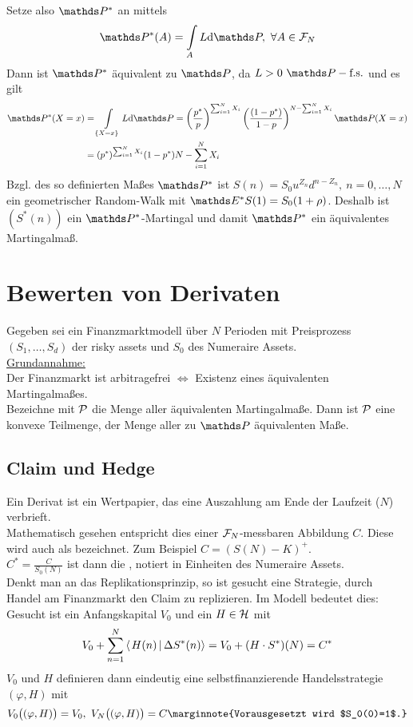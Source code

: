 \begin{enumerate}[(a)]
	Setze also $\Pw^*$ an mittels
	\[
	\Pw^*(A)=\int\limits_A L\dint \Pw,~\forall A\in \F_N
	\]
	Dann ist $\Pw^*$ äquivalent zu $\Pw$, da $L>0~\Pfs$ und es gilt
	\begin{equation*}
	\begin{aligned}
		\Pw^*(X=x) &= \int\limits_{\{X=x\}}L\dint \Pw=\enbrace{\frac{p^*}{p}}^{\sum_{i=1}^{N}X_i}\enbrace{\frac{(1-p^*)}{1-p}}^{N-\sum_{i=1}^{N}X_i} \Pw(X=x)\\
		&= (p^*)^{\sum_{i=1}^{N}X_i}(1-p^*){N-\sum_{i=1}^{N}X_i}
	\end{aligned}
	\end{equation*}
	Bzgl. des so definierten Maßes $\Pw^*$ ist $S(n)=S_0u^{Z_n}d^{n-Z_n},~n=0,\dots,N$ ein geometrischer Random-Walk mit $\E^*S(1)=S_0(1+\rho)$.
	Deshalb ist $(S^*(n))$ ein $\Pw^*$-Martingal und damit $\Pw^*$ ein äquivalentes Martingalmaß.
\end{enumerate}

\newpage
\section{Bewerten von Derivaten}
\label{sec:bewerten_derivate}
Gegeben sei ein Finanzmarktmodell über $N$ Perioden mit Preisprozess $(S_1,\dots,S_d)$ der risky assets und $S_0$ des Numeraire Assets.\\

\uline{Grundannahme:}\\
Der Finanzmarkt ist arbitragefrei $\Leftrightarrow$ Existenz eines äquivalenten Martingalmaßes.\\
Bezeichne mit $\mathcal{P}$ die Menge aller äquivalenten Martingalmaße.
Dann ist $\mathcal{P}$ eine konvexe Teilmenge, der Menge aller zu $\Pw$ äquivalenten Maße.

\subsection{Claim und Hedge}
\label{sub:claim_hedge}
Ein Derivat ist ein Wertpapier, das eine Auszahlung am Ende der Laufzeit ($N$) verbrieft.\\
Mathematisch gesehen entspricht dies einer $\mathcal{F}_N$-messbaren Abbildung $C$.
Diese wird auch als  bezeichnet.
Zum Beispiel $C=(S(N)-K)^+$.\\
$C^*=\frac{C}{S_0(N)}$ ist dann die , notiert in Einheiten des Numeraire Assets.\\
Denkt man an das Replikationsprinzip, so ist gesucht eine Strategie, durch Handel am Finanzmarkt den Claim zu replizieren.
Im Modell bedeutet dies:\\
Gesucht ist ein Anfangskapital $V_0$ und ein $H\in \mathcal{H}$ mit 
\[
V_0+\sum_{n=1}^{N}\sprod{H(n)}{\Delta S^*(n)}=V_0+(H\cdot S^*)(N)=C^*
\]
$V_0$ und $H$ definieren dann eindeutig eine selbstfinanzierende Handelsstrategie $(\varphi,H)$ mit
\[
V_0\big((\varphi,H)\big)=V_0,~ V_N\big((\varphi,H)\big)=C\marginnote{Vorausgesetzt wird $S_0(0)=1$.}
\]

